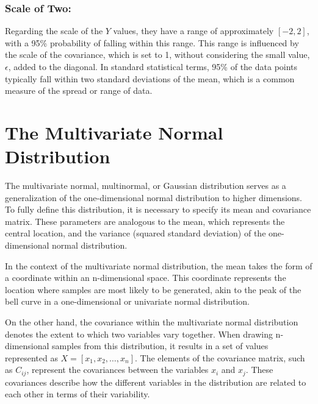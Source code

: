 \documentclass[
  letterpaper,
  DIV=11,
  numbers=noendperiod]{scrreprt}
\begin{document}
\hypertarget{scale-of-two}{%
\subsubsection{Scale of Two:}\label{scale-of-two}}

Regarding the scale of the \(Y\) values, they have a range of
approximately \([-2,2]\), with a 95\% probability of falling within this
range. This range is influenced by the scale of the covariance, which is
set to 1, without considering the small value, \(\epsilon\), added to
the diagonal. In standard statistical terms, 95\% of the data points
typically fall within two standard deviations of the mean, which is a
common measure of the spread or range of data.

\hypertarget{the-multivariate-normal-distribution}{%
\section{The Multivariate Normal
Distribution}\label{the-multivariate-normal-distribution}}

The multivariate normal, multinormal, or Gaussian distribution serves as
a generalization of the one-dimensional normal distribution to higher
dimensions. To fully define this distribution, it is necessary to
specify its mean and covariance matrix. These parameters are analogous
to the mean, which represents the central location, and the variance
(squared standard deviation) of the one-dimensional normal distribution.

In the context of the multivariate normal distribution, the mean takes
the form of a coordinate within an n-dimensional space. This coordinate
represents the location where samples are most likely to be generated,
akin to the peak of the bell curve in a one-dimensional or univariate
normal distribution.

On the other hand, the covariance within the multivariate normal
distribution denotes the extent to which two variables vary together.
When drawing n-dimensional samples from this distribution, it results in
a set of values represented as \(X = [x_1, x_2, \ldots, x_n]\). The
elements of the covariance matrix, such as \(C_{ij}\), represent the
covariances between the variables \(x_i\) and \(x_j\). These covariances
describe how the different variables in the distribution are related to
each other in terms of their variability.
\end{document}

